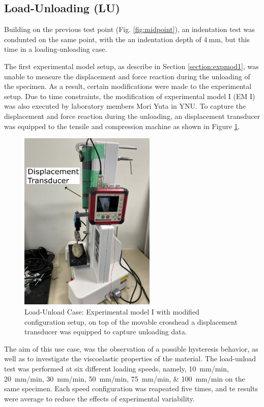 \subsection*{Load-Unloading (LU)}
\label{subsection:loadunload}
Building on the previous test point (Fig. \ref{fig:midpoint}), an indentation
 test was condunted on the same point, with the an indentation depth of 
 $\SI{4}{\milli \m}$, but this time in a loading-unloading case.

The first experimental model setup, as describe in Section \ref{section:expmod1},
was unable to measure the displacement and force reaction during the unloading 
of the specimen. As a result, certain modifications were made to the experimental 
setup. Due to time constraints, the modification of experimental model I (EM I)
was also executed by laboratory members Mori Yuta in YNU.
To capture the displacement and force reaction during the unloading, an 
displacement transducer was equipped to the tensile and compression machine 
as shown in Figure \ref{fig:unloadingexp1}.

\begin{figure}%
    \centering
   \quad
   \includegraphics[width=6.5cm]{Images/Experiment/unloading.png}%
   \caption[Load-Unloading test]{Load-Unload Case: Experimental model I with modified configuration setup, on top of the movable crosshead a displacement transducer was equipped to capture unloading data.}%
   \label{fig:unloadingexp1}%
\end{figure}
 
The aim of this use case, was the observation of a possible hysteresis
behavior, as well as to investigate the viscoelastic properties of the material.
The load-unload test was performed at six different loading speeds, namely, 
\SIlist[per-mode = symbol]{10;20;30;50;75;100}{\milli \metre \per \minute} on the 
same specimen.
Each speed configuration was reapeated five times, and te results were average to 
reduce the effects of experimental variability.\\

